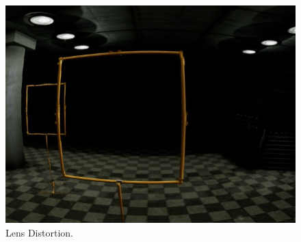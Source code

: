 \begin{figure}[htbp]
\begin{minipage}{0.33\textwidth}
		\includegraphics[width=\textwidth]{fig/gate_example_distorted}
		\caption{Lens Distortion. }		
		\label{fig:distortion}
	\end{minipage}
	

\end{figure}

